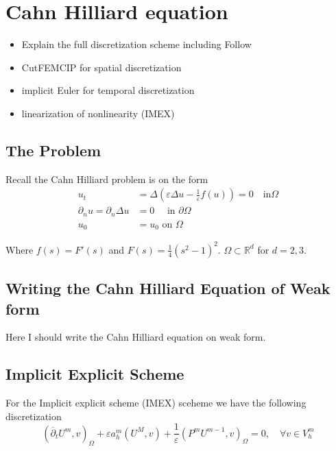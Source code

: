 
\newpage
\section{Cahn Hilliard equation }%
\label{sec:cahn_hilliard_equation}


\begin{itemize}
    \item Explain the full discretization scheme including Follow \cite{feng2007fully}
    \item CutFEMCIP for spatial discretization
    \item implicit Euler for temporal discretization
    \item linearization of nonlinearity (IMEX)
\end{itemize}


\subsection{The Problem}%
\label{sub:the_problem}

Recall the Cahn Hilliard problem is on the form
\[
    \begin{split}
        u_{t} & = \Delta ( \varepsilon  \Delta u - \frac{1}{\varepsilon } f( u) ) = 0 \quad \text{in} \Omega \\
        \partial _{n} u = \partial _{n} \Delta u & = 0 \quad \text{ in } \partial \Omega \\
        u_{0} & = u_{0}   \text{ on } \Omega
    \end{split}
\]

Where $f( s)  = F' ( s)  $ and $F( s)  = \frac{1}{4} ( s^2 - 1)^2 $. $\Omega \subset \mathbb{R} ^{d} $  for $d = 2,3$.



\subsection{Writing the Cahn Hilliard Equation of Weak form}%
\label{sub:writing_the_cahn_hilliard_equation_of_weak_form}

Here I should write the Cahn Hilliard equation on weak form.


\subsection{Implicit Explicit Scheme}%
\label{sub:implicit_explicit_scheme}


For the Implicit explicit scheme (IMEX) sceheme we have the following discretization
\[
( \overline{\partial } _{t} U^{m}, v   )_{\Omega } + \varepsilon a^{m}_{h}( U^{M} , v) + \frac{1}{\varepsilon } ( P^{m} U^{m-1}, v) _{\Omega } =0, \quad \forall v \in V_{h}^{m}
\]

